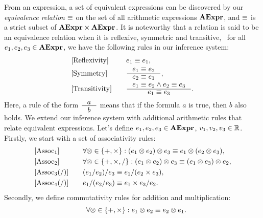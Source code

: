 From an expression, a set of equivalent expressions can be discovered by our
\emph{equivalence relation} $\equiv$ on the set of all arithmetic expressions
$\mathbf{AExpr}$, and $\equiv$ is a strict subset of $\mathbf{AExpr}\times\mathbf{AExpr}$.  It
is noteworthy that a relation is said to be an equivalence relation when it is
reflexive, symmetric and transitive, \ie~for all $e_1, e_2, e_3 \in \mathbf{AExpr}$,
we have the following rules in our inference system:
\begin{equation}
    \begin{aligned}{}
        & [\mathrm{Reflexivity}] & \quad &
            e_1 \eqrel e_1, \\
        & [\mathrm{Symmetry}] & \quad &
            \inference{e_1 \eqrel e_2}{e_2 \eqrel e_1}, \\
        & [\mathrm{Transitivity}] & \quad &
            \inference{e_1 \eqrel e_2 \wedge e_2 \eqrel e_3}{e_1 \eqrel e_3}.
    \end{aligned}
    \label{so:eq:equivalence_relation}
\end{equation}
Here, a rule of the form $\inference{a}{b}$ means that if the formula $a$ is
true, then $b$ also holds.  We extend our inference system with additional
arithmetic rules that relate equivalent expressions.  Let's define $e_1, e_2,
e_3 \in \mathbf{AExpr}$, $v_1, v_2, v_3 \in \mathbb{R}$.  Firstly, we start with a set
of associativity rules:
\begin{equation}
    \begin{aligned}{}
        & [\mathrm{Assoc}_1] & \quad &
            \forall \otimes \in \{ +, \times \}:
            (e_1 \otimes e_2) \otimes e_3
            \equiv e_1 \otimes (e_2 \otimes e_3), \\
        & [\mathrm{Assoc}_2] & \quad &
            \forall \otimes \in \{ +, \times, / \}:
            (e_1 \otimes e_2) \otimes e_3
            \equiv (e_1 \otimes e_3) \otimes e_2, \\
        & [\mathrm{Assoc}_3 (/)] & \quad &
            (e_1 / e_2) / e_3 \equiv e_1 / (e_2 \times e_3), \\
        & [\mathrm{Assoc}_4 (/)] & \quad &
            e_1 / (e_2 / e_3) \equiv e_1 \times e_3 / e_2.
    \end{aligned}
\end{equation}
Secondly, we define commutativity rules for addition and multiplication:
\begin{equation}
    [\mathrm{Commut}] \quad
    \forall \opsymbol \in \{ +, \times \}:
        e_1 \opsymbol e_2 \eqrel e_2 \opsymbol e_1.
\end{equation}
